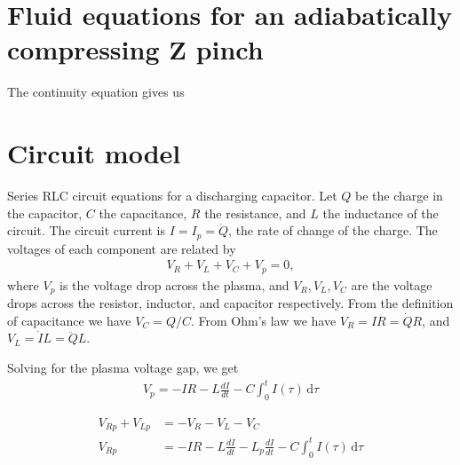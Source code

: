 \documentclass{article}
\begin{document}
\section{Fluid equations for an adiabatically compressing Z pinch}


The continuity equation gives us 


\section{Circuit model}

Series RLC circuit equations for a discharging capacitor.
Let $Q$ be the charge in the capacitor, $C$ the capacitance, $R$ the resistance,
and $L$ the inductance of the circuit.
The circuit current is $I = I_p = \dot{Q}$, the rate of change of the charge.
The voltages of each component are related by
\begin{align}
V_R + V_L + V_C + V_p = 0,
\end{align}
where $V_p$ is the voltage drop across the plasma, and $V_R, V_L, V_C$ are the voltage drops across the resistor, inductor, and capacitor respectively.
From the definition of capacitance we have $V_C = Q/C$. From Ohm's law we have $V_R = IR = \dot{Q} R$, 
and $V_L = \dot{I} L = \ddot{Q} L$.

Solving for the plasma voltage gap, we get
\begin{align*}
V_p = -IR - L \frac{dI}{dt} - C \int_0^t I(\tau) \, \mathrm{d} \tau
\end{align*}

\begin{align*}
    V_{Rp} + V_{Lp} &= -V_R - V_L - V_C \\
    V_{Rp} &= -IR - L \frac{dI}{dt} - L_p \frac{dI}{dt} - C \int_0^t I(\tau) \, \mathrm{d} \tau
\end{align*}
\end{document}
